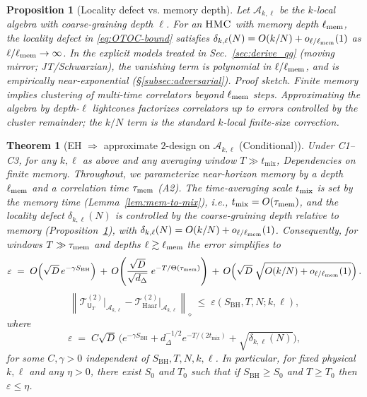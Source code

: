 \documentclass[a4paper,11pt]{article}
\newcommand{\HMC}{\textup{\textsc{HMC}}\xspace}
\let\mathscr\mathcal
\theoremstyle{plain}
\newtheorem{theorem}{Theorem}
\newtheorem{proposition}{Proposition}
\theoremstyle{definition}
\theoremstyle{remark}
\begin{document}
\begin{proposition}[Locality defect vs. memory depth]
\label{prop:delta-locality}
Let $\mathscr A_{k,\ell}$ be the $k$-local algebra with coarse-graining depth $\ell$. For an $\HMC{}$ with memory depth $\ell_{\rm mem}$,
the locality defect in \eqref{eq:OTOC-bound} satisfies $\delta_{k,\ell}(N)=O(k/N)+o_{\ell/\ell_{\rm mem}}(1)$ as $\ell/\ell_{\rm mem}\to\infty$.
In the explicit models treated in Sec.~\ref{sec:derive_qg} (moving mirror; JT/Schwarzian), the vanishing term is polynomial in $\ell/\ell_{\rm mem}$,
and is empirically near-exponential (\S\ref{subsec:adversarial}).
\emph{Proof sketch.} Finite memory implies clustering of multi-time correlators beyond $\ell_{\rm mem}$ steps.
Approximating the algebra by depth-$\ell$ lightcones factorizes correlators up to errors controlled by the cluster remainder;
the $k/N$ term is the standard $k$-local finite-size correction.
\end{proposition}

\begin{theorem}[EH $\Rightarrow$ approximate $2$-design on $\mathscr{A}_{k,\ell}$ (Conditional)]\label{thm:EH-2design}
Under C1--C3, for any $k,\ell$ as above and any averaging window $T\gg t_{\mathrm{mix}}$,
\noindent\emph{Dependencies on finite memory.} Throughout, we parameterize near-horizon memory by a depth $\ell_{\rm mem}$ and a correlation time $\tau_{\rm mem}$ (A2).
The time-averaging scale $t_{\rm mix}$ is set by the memory time (Lemma~\ref{lem:mem-to-mix}), i.e., $t_{\rm mix}=O(\tau_{\rm mem})$,
and the locality defect $\delta_{k,\ell}(N)$ is controlled by the coarse-graining depth relative to memory (Proposition~\ref{prop:delta-locality}),
with $\delta_{k,\ell}(N)=O(k/N)+o_{\ell/\ell_{\rm mem}}(1)$.
Consequently, for windows $T\gg \tau_{\rm mem}$ and depths $\ell\gtrsim \ell_{\rm mem}$ the error simplifies to
\begin{equation}
 \varepsilon \;=\; O\!\left( \sqrt{D}\,e^{-\gamma S_{\mathrm{BH}}} \right)
 \, +\, O\!\left( \frac{\sqrt{D}}{\sqrt{d_\Delta}}\; e^{-T/\Theta(\tau_{\rm mem})} \right)
 \, +\, O\!\left( \sqrt{D}\;\sqrt{O(k/N)+o_{\ell/\ell_{\rm mem}}(1)} \right).
\end{equation}
\begin{equation}\label{eq:main-eps}
 \left\| \mathcal{T}^{(2)}_{\mathsf{U}_T}\big|_{\mathscr{A}_{k,\ell}} - \mathcal{T}^{(2)}_{\mathrm{Haar}}\big|_{\mathscr{A}_{k,\ell}} \right\|_{\diamond}
 \;\le\; \varepsilon(S_{\mathrm{BH}},T,N;k,\ell),
\end{equation}
where
\begin{equation}
 \varepsilon \;=\; C \sqrt{D}\,\Big( e^{-\gamma S_{\mathrm{BH}}}
 + d_\Delta^{-1/2} e^{-T/(2t_{\mathrm{mix}})} + \sqrt{\delta_{k,\ell}(N)} \Big),
\end{equation}
for some $C,\gamma>0$ independent of $S_{\mathrm{BH}},T,N,k,\ell$.  In particular, for fixed physical $k,\ell$ and any $\eta>0$, there exist $S_0$ and $T_0$ such that if $S_{\mathrm{BH}}\ge S_0$ and $T\ge T_0$ then $\varepsilon\le \eta$.
\end{theorem}
\end{document}
